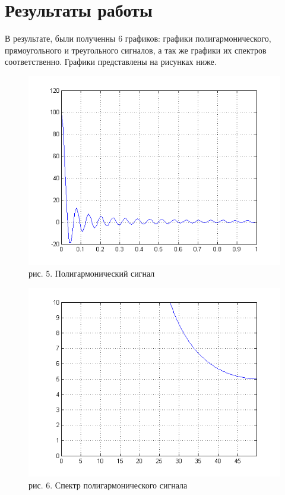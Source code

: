 \documentclass[10pt,a4paper]{report}
\begin{document}
\section{Результаты работы}
В результате, были полученны 6 графиков: графики полигармонического, прямоугольного и треугольного сигналов, а так же графики их спектров соответственно. Графики представлены на рисунках ниже.
\begin{figure}
\begin{center}
\includegraphics[width=150mm, scale = 0.9]{5_1.png}\newline
рис. 5. Полигармонический сигнал\newline
\end{center}
\end{figure}
\begin{figure}
\begin{center}
\includegraphics[width=150mm, scale = 0.9]{5_2.png}\newline
рис. 6. Спектр полигармонического сигнала\newline
\end{center}
\end{figure}
\end{document}
